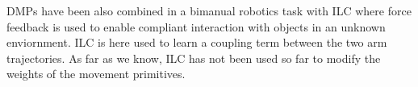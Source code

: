 DMPs have been also combined in a bimanual robotics task with ILC \cite{Gams13} where force feedback is used to enable compliant interaction with objects in an unknown enviornment. ILC is here used to learn a coupling term between the two arm trajectories. As far as we know, ILC has not been used so far to modify the weights of the movement primitives.
